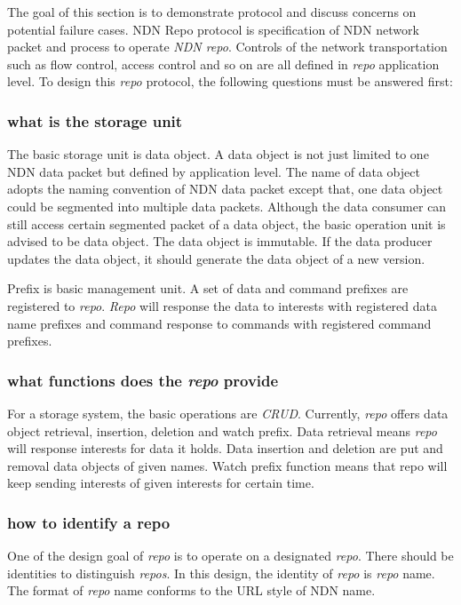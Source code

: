 \documentclass[conference]{IEEEtran}
\begin{document}
The goal of this section is to demonstrate protocol and discuss concerns on potential failure cases. NDN Repo protocol is specification of NDN network packet and process to operate \emph{NDN repo}. Controls of the network transportation such as flow control, access control and so on are all defined in \emph{repo} application level. To design this \emph{repo} protocol, the following questions must be answered first:

\subsubsection{what is the storage unit}

The basic storage unit is data object. A data object is not just limited to one NDN data packet but defined by application level. The name of data object adopts the naming convention of NDN data packet except that, one data object could be segmented into multiple data packets. Although the data consumer can still access certain segmented packet of a data object, the basic operation unit is advised to be data object. The data object is immutable. If the data producer updates the data object, it should generate the data object of a new version.

Prefix is basic management unit. A set of data and command prefixes are registered to \emph{repo}. \emph{Repo} will response the data to interests with registered data name prefixes and command response to commands with registered command prefixes.

\subsubsection{what functions does the \emph{repo} provide}

For a storage system, the basic operations are \emph{CRUD}. Currently, \emph{repo} offers data object retrieval, insertion, deletion and watch prefix. Data retrieval means \emph{repo} will response interests for data it holds. Data insertion and deletion are put and removal data objects of given names. Watch prefix function means that repo will keep sending interests of given interests for certain time.

\subsubsection{how to identify a repo}

One of the design goal of \emph{repo} is to operate on a designated \emph{repo}. There should be identities to distinguish \emph{repos}. In this design, the identity of \emph{repo} is \emph{repo} name. The format of \emph{repo} name conforms to the URL style of NDN name.
\end{document}
